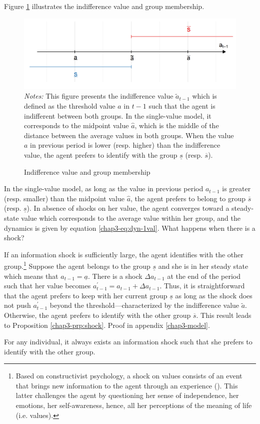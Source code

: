 Figure \ref{chap3-fig:theory-choice-a} illustrates the indifference value and group membership.
\begin{figure}[!tb]
    \centering
    \caption{Indifference value and group membership}
    \label{chap3-fig:theory-choice-a}
    \includegraphics[width=.8\linewidth]{chap3/graphic/theory-choice-a.png}
	\vspace{-3em}
	\justify\singlespacing\footnotesize{\textit{Notes:} This figure presents the indifference value $\widetilde{a}_{t-1}$ which is defined as the threshold value $a$ in $t-1$ such that the agent is indifferent between both groups. In the single-value model, it corresponds to the midpoint value $\widehat{a}$, which is the middle of the distance between the average values in both groups. When the value $a$ in previous period is lower (resp. higher) than the indifference value, the agent prefers to identify with the group $\underline{s}$ (resp. $\overline{s}$).}
\end{figure}
In the single-value model, as long as the value in previous period $a_{t-1}$ is greater (resp. smaller) than the midpoint value $\widehat{a}$, the agent prefers to belong to group $\overline{s}$ (resp. $\underline{s}$). In absence of shocks on her value, the agent converges toward a steady-state value which corresponds to the average value within her group, and the dynamics is given by equation \eqref{chap3-eq:dyn-1val}. What happens when there is a shock?


If an information shock is sufficiently large, the agent identifies with the other group.\footnote{Based on constructivist psychology, a shock on values consists of an event that brings new information to the agent through an experience (\citealt{Levitt2004Transformational}). This latter challenges the agent by questioning her sense of independence, her emotions, her self-awareness, hence, all her perceptions of the meaning of life (i.e. values).} Suppose the agent belongs to the group $\underline{s}$ and she is in her steady state which means that $a_{t-1} = \underline{a}$. There is a shock $\Delta a_{t-1}$ at the end of the period such that her value becomes $a_{t-1}^\prime = a_{t-1} + \Delta a_{t-1}$. Thus, it is straightforward that the agent prefers to keep with her current group $\underline{s}$ as long as the shock does not push $a_{t-1}^\prime$ beyond the threshold---characterized by the indifference value $\widetilde{a}$. Otherwise, the agent prefers to identify with the other group $\overline{s}$. This result leads to Proposition \ref{chap3-prp:shock}. Proof in appendix \ref{chap3-model}.
\begin{proposition}\label{chap3-prp:shock}
    For any individual, it always exists an information shock such that she prefers to identify with the other group.
\end{proposition}

